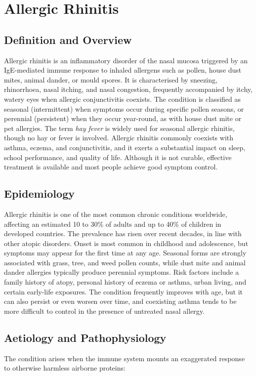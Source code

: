 \chapter{Allergic Rhinitis}

\section*{Definition and Overview}
Allergic rhinitis is an inflammatory disorder of the nasal mucosa triggered by an IgE-mediated immune response to inhaled allergens such as pollen, house dust mites, animal dander, or mould spores. It is characterised by sneezing, rhinorrhoea, nasal itching, and nasal congestion, frequently accompanied by itchy, watery eyes when allergic conjunctivitis coexists. The condition is classified as seasonal (intermittent) when symptoms occur during specific pollen seasons, or perennial (persistent) when they occur year-round, as with house dust mite or pet allergies. The term \emph{hay fever} is widely used for seasonal allergic rhinitis, though no hay or fever is involved. Allergic rhinitis commonly coexists with asthma, eczema, and conjunctivitis, and it exerts a substantial impact on sleep, school performance, and quality of life. Although it is not curable, effective treatment is available and most people achieve good symptom control.

\section*{Epidemiology}
Allergic rhinitis is one of the most common chronic conditions worldwide, affecting an estimated 10 to 30\% of adults and up to 40\% of children in developed countries. The prevalence has risen over recent decades, in line with other atopic disorders. Onset is most common in childhood and adolescence, but symptoms may appear for the first time at any age. Seasonal forms are strongly associated with grass, tree, and weed pollen counts, while dust mite and animal dander allergies typically produce perennial symptoms. Risk factors include a family history of atopy, personal history of eczema or asthma, urban living, and certain early-life exposures. The condition frequently improves with age, but it can also persist or even worsen over time, and coexisting asthma tends to be more difficult to control in the presence of untreated nasal allergy.

\section*{Aetiology and Pathophysiology}
The condition arises when the immune system mounts an exaggerated response to otherwise harmless airborne proteins:

